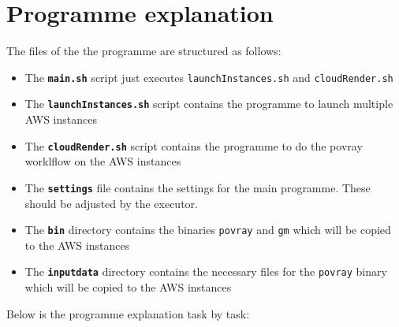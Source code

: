 \documentclass{article}
\begin{document}


\section{Programme explanation}
The files of the the programme are structured as follows:

\begin{itemize}
\item The \texttt{\textbf{main.sh}} script just executes \texttt{launchInstances.sh} and \texttt{cloudRender.sh}
\item The \texttt{\textbf{launchInstances.sh}} script contains the programme to launch multiple AWS instances
\item The \texttt{\textbf{cloudRender.sh}} script contains the programme to do the povray worklflow on the AWS instances
\item The \texttt{\textbf{settings}} file contains the settings for the main programme. These should be adjusted by the executor.
\item The \texttt{\textbf{bin}} directory contains the binaries \texttt{povray} and \texttt{gm} which will be copied to the AWS instances
\item The \texttt{\textbf{inputdata}} directory contains the necessary files for the \texttt{povray} binary which will be copied to the AWS instances
\end{itemize}

Below is the programme explanation task by task:
\end{document}
